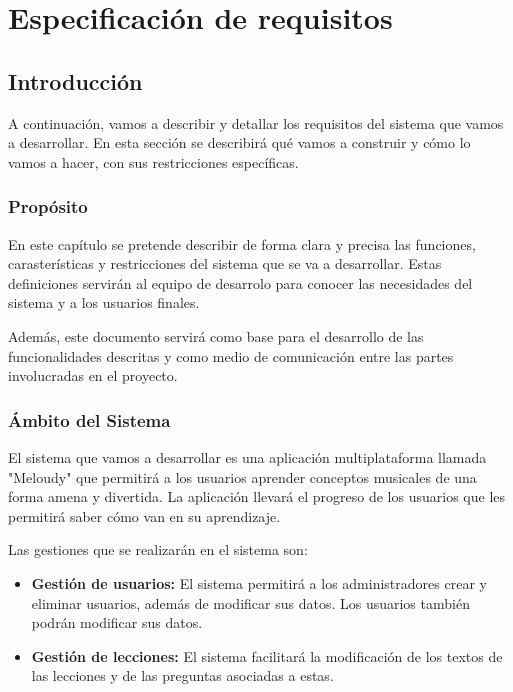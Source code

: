 \chapter{Especificación de requisitos}


\section{Introducción}
A continuación, vamos a describir y detallar los requisitos del sistema 
que vamos a desarrollar. En esta sección se describirá qué vamos a construir y cómo lo vamos
a hacer, con sus restricciones específicas.

\subsection{Propósito}
En este capítulo se pretende describir de forma clara y precisa las funciones, carasterísticas y restricciones 
del sistema que se va a desarrollar. Estas definiciones servirán al equipo de desarrolo para 
conocer las necesidades del sistema y a los usuarios finales. 

Además, este documento servirá como base para el desarrollo de las funcionalidades descritas y como medio de comunicación 
entre las partes involucradas en el proyecto.
\subsection{Ámbito del Sistema}
El sistema que vamos a desarrollar es una aplicación multiplataforma llamada "Meloudy" que permitirá a los usuarios
aprender conceptos musicales de una forma amena y divertida. La aplicación llevará el progreso de los usuarios que les permitirá saber cómo van en su aprendizaje.

Las gestiones que se realizarán en el sistema son:
\begin{itemize}
    \item \textbf{Gestión de usuarios: } El sistema permitirá a los administradores crear y eliminar usuarios, además de modificar sus datos. Los usuarios también podrán
    modificar sus datos.
    \item \textbf{Gestión de lecciones: } El sistema facilitará la modificación de los textos de las lecciones y de las preguntas asociadas a estas.
\end{itemize}


